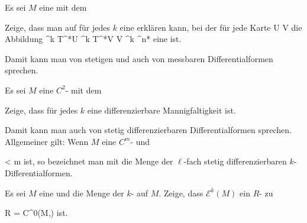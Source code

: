 \setcounter{section}{14}


{}
{

Es sei $M$ eine
mit dem

 Zeige, dass man auf
 für jedes $k$ eine
erklären kann, bei der für jede Karte
\maabb {\alpha} { U } { V
} {}
die Abbildung
\maabbdisp {} {\bigwedge^k T^*U} { \bigwedge^k T^*V \cong V \times \bigwedge^k \R^{n*}
} {}
eine
ist.

}
{} {}
Damit kann man von stetigen und auch von messbaren Differentialformen sprechen.

{}
{

Es sei $M$ eine
$C^2$-
mit dem

 Zeige, dass
 für jedes $k$ eine differenzierbare Mannigfaltigkeit ist.

}
{} {}
Damit kann man auch von stetig differenzierbaren Differentialformen sprechen. Allgemeiner gilt: Wenn $M$ eine
$C^m$-
und

\mavergleichskette
{\vergleichskette
{  \ell
}
{ < }{ m
}
{  }{
}
{    }{
}
{   }{
}
}
{}{}{}
ist, so bezeichnet man mit
 die Menge der $\ell$-fach stetig differenzierbaren $k$-Differentialformen.

{}
{

Es sei $M$ eine
und
 die Menge der
$k$-
auf $M$. Zeige, dass ${ \mathcal E }^{ k } (  M   )$ ein
$R$-
zu

\mavergleichskette
{\vergleichskette
{R
}
{ = }{ C^0(M,\R)
}
{  }{
}
{    }{
}
{   }{
}
}
{}{}{}
ist.

}
{} {}

